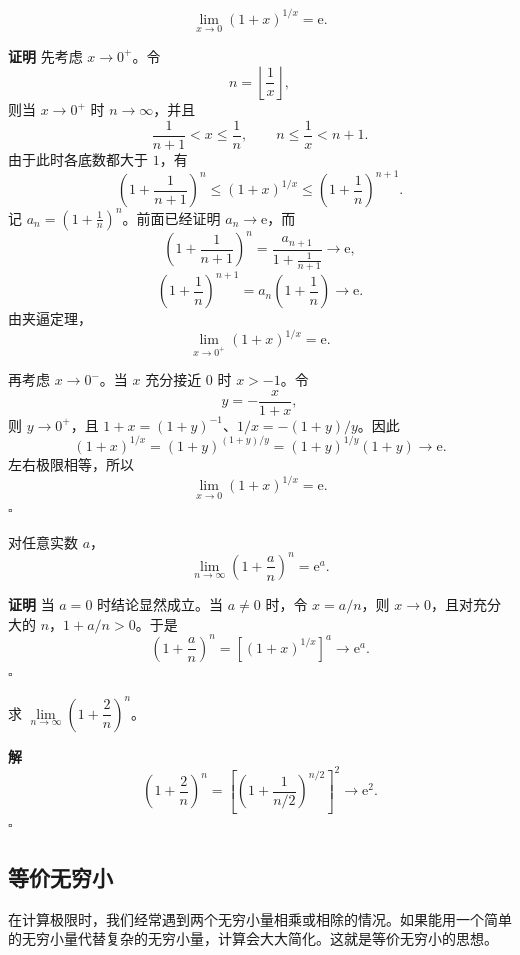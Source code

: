 \documentclass[fontset=fandol]{ctexart}
\newenvironment{proofdetail}{\par\noindent\textbf{证明}\quad}{\hfill$\square$\par\vspace{0.8em}}
\newenvironment{solution}{\par\noindent\textbf{解}\quad}{\hfill$\square$\par\vspace{0.8em}}
\newcommand{\ee}{\mathrm{e}}
\begin{document}
\begin{theorem}[第二个重要极限]
\[
\lim_{x\to0}(1+x)^{1/x}=\ee.
\]
\end{theorem}
\begin{proofdetail}
先考虑 \(x\to0^+\)。令
\[
n=\left\lfloor\frac1x\right\rfloor,
\]
则当 \(x\to0^+\) 时 \(n\to\infty\)，并且
\[
\frac1{n+1}<x\leq\frac1n,\qquad n\leq\frac1x<n+1.
\]
由于此时各底数都大于 \(1\)，有
\[
\left(1+\frac1{n+1}\right)^n
\leq(1+x)^{1/x}
\leq\left(1+\frac1n\right)^{n+1}.
\]
记 \(a_n=(1+\frac1n)^n\)。前面已经证明 \(a_n\to\ee\)，而
\[
\left(1+\frac1{n+1}\right)^n
=\frac{a_{n+1}}{1+\frac1{n+1}}\to\ee,
\]
\[
\left(1+\frac1n\right)^{n+1}
=a_n\left(1+\frac1n\right)\to\ee.
\]
由夹逼定理，
\[
\lim_{x\to0^+}(1+x)^{1/x}=\ee.
\]

再考虑 \(x\to0^-\)。当 \(x\) 充分接近 \(0\) 时 \(x>-1\)。令
\[
y=-\frac{x}{1+x},
\]
则 \(y\to0^+\)，且 \(1+x=(1+y)^{-1}\)、\(1/x=-(1+y)/y\)。因此
\[
(1+x)^{1/x}
=(1+y)^{(1+y)/y}
=(1+y)^{1/y}(1+y)\to\ee.
\]
左右极限相等，所以
\[
\lim_{x\to0}(1+x)^{1/x}=\ee.
\]
\end{proofdetail}

\begin{theorem}[第二个重要极限的离散推广]
对任意实数 \(a\)，
\[
\lim_{n\to\infty}\left(1+\frac an\right)^n=\ee^a.
\]
\end{theorem}
\begin{proofdetail}
当 \(a=0\) 时结论显然成立。当 \(a\neq0\) 时，令 \(x=a/n\)，则 \(x\to0\)，且对充分大的 \(n\)，\(1+a/n>0\)。于是
\[
\left(1+\frac an\right)^n
=\left[(1+x)^{1/x}\right]^a\longrightarrow\ee^a.
\]
\end{proofdetail}


\begin{example}
	求 \(\lim\limits_{n\to\infty} \left(1 + \dfrac{2}{n}\right)^n\)。
\end{example}
\begin{solution}
	\[
	\left(1 + \dfrac{2}{n}\right)^n = \left[\left(1 + \dfrac{1}{n/2}\right)^{n/2}\right]^2 \to \ee^2.
	\]
\end{solution}

\subsection{等价无穷小}

在计算极限时，我们经常遇到两个无穷小量相乘或相除的情况。如果能用一个简单的无穷小量代替复杂的无穷小量，计算会大大简化。这就是等价无穷小的思想。
\end{document}
